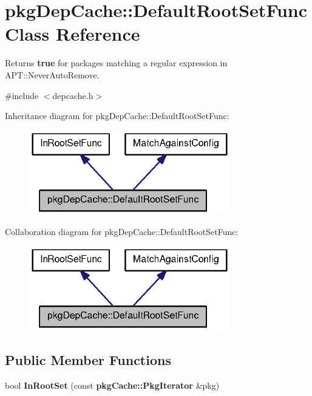 \section{pkg\-Dep\-Cache\-:\-:\-Default\-Root\-Set\-Func \-Class \-Reference}
\label{classpkgDepCache_1_1DefaultRootSetFunc}


\-Returns {\bfseries true} for packages matching a regular expression in \-A\-P\-T\-::\-Never\-Auto\-Remove.  




{\ttfamily \#include $<$depcache.\-h$>$}



\-Inheritance diagram for pkg\-Dep\-Cache\-:\-:\-Default\-Root\-Set\-Func\-:
\nopagebreak
\begin{figure}[H]
\begin{center}
\leavevmode
\includegraphics[width=248pt]{classpkgDepCache_1_1DefaultRootSetFunc__inherit__graph}
\end{center}
\end{figure}


\-Collaboration diagram for pkg\-Dep\-Cache\-:\-:\-Default\-Root\-Set\-Func\-:
\nopagebreak
\begin{figure}[H]
\begin{center}
\leavevmode
\includegraphics[width=248pt]{classpkgDepCache_1_1DefaultRootSetFunc__coll__graph}
\end{center}
\end{figure}
\subsection*{\-Public \-Member \-Functions}
\begin{DoxyCompactItemize}
\item 
bool {\bfseries \-In\-Root\-Set} (const {\bf pkg\-Cache\-::\-Pkg\-Iterator} \&pkg)\label{classpkgDepCache_1_1DefaultRootSetFunc_a1e44e2c92ffa13dc9c21a993df5c98c7}

\end{DoxyCompactItemize}


